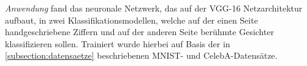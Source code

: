 \textit{Anwendung} fand das neuronale Netzwerk, das auf der VGG-16 Netzarchitektur aufbaut, in zwei Klassifikationsmodellen, welche auf der einen Seite handgeschriebene Ziffern und auf der anderen Seite berühmte Gesichter klassifizieren sollen. Trainiert wurde hierbei auf Basis der in \ref{subsection:datensaetze} beschriebenen MNIST- und CelebA-Datensätze.


\begin{table}[h]
	\centering
	\renewcommand{\arraystretch}{1.5}
	\caption{Hyperparameter des \glqq normalen\grqq{} Trainings bezüglich der angegebenen Datensätze}
	\label{tab:nn_train}
\end{table}


